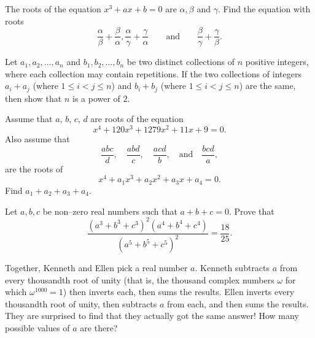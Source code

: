 \begin{question}
    The roots of the equation $x^{3} +ax +b=0$ are $\alpha, \beta$ and $\gamma$. Find the equation with roots \[\frac{\alpha}{\beta} + \frac{\beta}{\alpha}, \frac{\alpha}{\gamma} + \frac{\gamma}{\alpha} \qquad \text{and} \qquad \frac{\beta}{\gamma} + \frac{\gamma}{\beta}.\]
\end{question}

\begin{question}
    Let $a_1, a_2, \dots, a_n$ and $b_1, b_2, \dots, b_n$ be two distinct collections of $n$ positive integers, where each collection may contain repetitions. If the two collections of integers $a_i + a_j $ (where $1 \leq i<j \leq n$) and $b_i + b_j $ (where $1 \leq i<j \leq n$) are the same, then show that $n$ is a power of $2$.
\end{question}


\begin{question}
    Assume that $a$, $b$, $c$, $d$ are roots of the equation \[x^4 + 120x^3 + 1279x^2 + 11x + 9 = 0.\] Also assume that \[\frac{abc}{d}, \quad \frac{abd}{c}, \quad \frac{acd}{b}, \quad \text{and} \quad \frac{bcd}{a},\] are the roots of \[x^4 + a_1x^3 + a_2x^2 + a_3x + a_4 = 0.\] Find $a_1 + a_2 + a_3 + a_4$.
\end{question}


\begin{question}
    Let $a,b,c$ be non--zero real numbers such that $a+b+c=0$. Prove that
    \[\frac{\left( a^{3}+b^{3}+c^{3} \right)^{2}\left( a^{4}+b^{4}+c^{4} \right)}{\left( a^{5}+b^{5}+c^{5} \right)^{2}}=\frac{18}{25}.\]
\end{question}

\begin{question}[name={2017 PUMaC}]
    Together, Kenneth and Ellen pick a real number $a$. Kenneth subtracts $a$ from every thousandth root of unity (that is, the thousand complex numbers $\omega$ for which $\omega^{1000}=1$) then inverts each, then sums the results. Ellen inverts every thousandth root of unity, then subtracts $a$ from each, and then sums the results. They are surprised to find that they actually got the same answer! How many possible values of $a$ are there?
\end{question}

